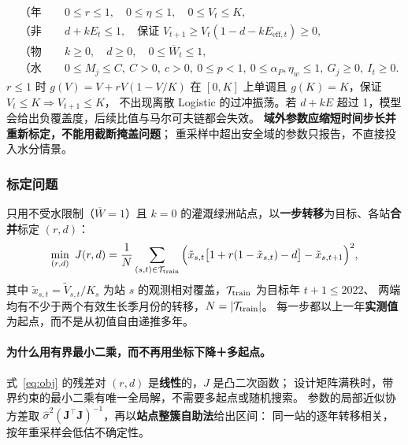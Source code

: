 \documentclass[11pt,a4paper]{ctexart}
\begin{document}
\begin{align}
&\text{（年步长安全域）} && 0\le r\le1,\quad 0\le\eta\le1,\quad 0\le V_t\le K,\label{eq:box}\\
&\text{（非负性）} && d+kE_t\le 1,\quad\text{保证 }V_{t+1}\ge V_t(1-d-kE_{\mathrm{eff},t})\ge0,\label{eq:nonneg}\\
&\text{（物理符号）} && k\ge0,\quad d\ge0,\quad 0\le\overline W_t\le1,\label{eq:sign}\\
&\text{（水分）} && 0\le M_j\le C,\ C>0,\ c>0,\ 0\le p<1,\ 0\le\alpha_P,\eta_w\le1,\ G_j\ge0,\ I_t\ge0.\label{eq:m1box}
\end{align}
$r\le1$ 时 $g(V)=V+rV(1-V/K)$ 在 $[0,K]$ 上单调且 $g(K)=K$，保证 $V_t\le K\Rightarrow V_{t+1}\le K$，
不出现离散 Logistic 的过冲振荡。若 $d+kE$ 超过 1，模型会给出负覆盖度，后续比值与马尔可夫链都会失效。
\textbf{域外参数应缩短时间步长并重新标定，不能用截断掩盖问题}；
重采样中超出安全域的参数只报告，不直接投入水分情景。

\subsubsection{标定问题}

只用不受水限制（$\overline W=1$）且 $k=0$ 的灌溉绿洲站点，以\textbf{一步转移}为目标、各站\textbf{合并}标定 $(r,d)$：
\begin{equation}\label{eq:obj}
\min_{(r,d)}\ J(r,d)=\frac{1}{N}\sum_{(s,t)\in\mathcal T_{\rm train}}
\Big(\tilde x_{s,t}\big[1+r(1-\tilde x_{s,t})-d\big]-\tilde x_{s,t+1}\Big)^2,
\end{equation}
其中 $\tilde x_{s,t}=\tilde V_{s,t}/K_s$ 为站 $s$ 的观测相对覆盖，$\mathcal T_{\rm train}$ 为目标年 $t+1\le2022$、
两端均有不少于两个有效生长季月份的转移，$N=|\mathcal T_{\rm train}|$。
每一步都以上一年\textbf{实测值}为起点，而不是从初值自由递推多年。

\paragraph{为什么用有界最小二乘，而不再用坐标下降＋多起点。}
式~\eqref{eq:obj} 的残差对 $(r,d)$ 是\textbf{线性}的，$J$ 是凸二次函数；
设计矩阵满秩时，带界约束的最小二乘有唯一全局解，不需要多起点或随机搜索。
参数的局部近似协方差取 $\hat\sigma^2(\bm J^\top\bm J)^{-1}$，再以\textbf{站点整簇自助法}给出区间：
同一站的逐年转移相关，按年重采样会低估不确定性。
\end{document}
